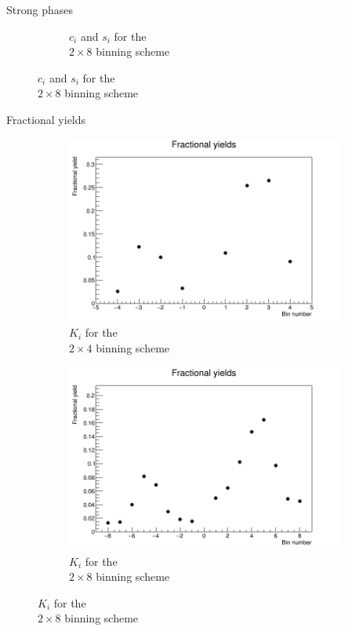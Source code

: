 \documentclass{beamer}
\begin{document}
\begin{frame}{Strong phases}
\begin{figure}
\begin{subfigure}{0.5\textwidth}
      \caption{$c_i$ and $s_i$ for the \\$2\times 8$ binning scheme}
    \end{subfigure}
  \end{figure}
\end{frame}

\begin{frame}{Fractional yields}
  \begin{figure}
    \centering
    \vspace{-0.2cm}
    \begin{subfigure}{0.5\textwidth}
      \includegraphics[width = 1.0\textwidth]{Plots/Amplitude_4bins_VariableBins_1p20923_50M_sample1_KKbar.png}
      \caption{$K_i$ for the \\$2\times 4$ binning scheme}
    \end{subfigure}%
    \begin{subfigure}{0.5\textwidth}
      \includegraphics[width = 1.0\textwidth]{Plots/Amplitude_8bins_VariableBins_0p645101_1p72065_2p09644_50M_sample1_KKbar.png}
      \caption{$K_i$ for the \\$2\times 8$ binning scheme}
    \end{subfigure}
  \end{figure}
\end{frame}
\end{document}
